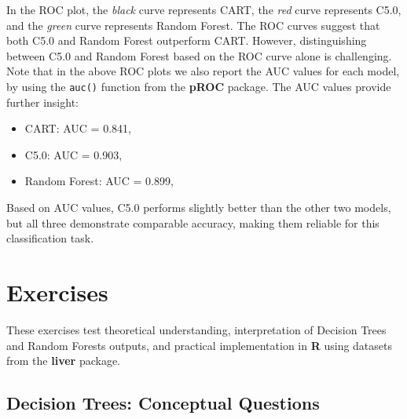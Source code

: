 \documentclass[
]{book}
\newcommand{\passthrough}[1]{#1}
\providecommand{\tightlist}{%
  \setlength{\itemsep}{0pt}\setlength{\parskip}{0pt}}
\theoremstyle{definition}
\theoremstyle{definition}
\theoremstyle{definition}
\theoremstyle{definition}
\theoremstyle{remark}
\begin{document}
In the ROC plot, the \emph{black} curve represents CART, the {\emph{red}} curve represents C5.0, and the {\emph{green}} curve represents Random Forest. The ROC curves suggest that both C5.0 and Random Forest outperform CART. However, distinguishing between C5.0 and Random Forest based on the ROC curve alone is challenging. Note that in the above ROC plots we also report the AUC values for each model, by using the \passthrough{\lstinline!auc()!} function from the \textbf{pROC} package. The AUC values provide further insight:

\begin{itemize}
\tightlist
\item
  CART: AUC = 0.841,\\
\item
  C5.0: AUC = 0.903,
\item
  Random Forest: AUC = 0.899,
\end{itemize}

Based on AUC values, C5.0 performs slightly better than the other two models, but all three demonstrate comparable accuracy, making them reliable for this classification task.

\section{Exercises}\label{tree-exercises}

These exercises test theoretical understanding, interpretation of Decision Trees and Random Forests outputs, and practical implementation in \textbf{R} using datasets from the \textbf{liver} package.

\subsection*{Decision Trees: Conceptual Questions}\label{decision-trees-conceptual-questions}
\end{document}
